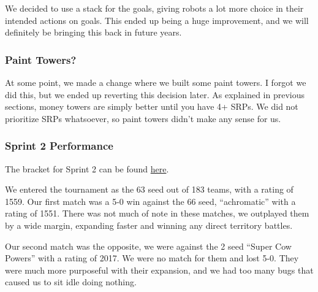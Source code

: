 \medskip

We decided to use a stack for the goals, giving robots a lot more choice in their intended actions on goals. This ended up being a huge improvement, and we will definitely be bringing this back in future years.

\subsubsection{Paint Towers?}

At some point, we made a change where we built some paint towers. I forgot we did this, but we ended up reverting this decision later. As explained in previous sections, money towers are simply better until you have 4+ SRPs. We did not prioritize SRPs whatsoever, so paint towers didn't make any sense for us.

\subsubsection{Sprint 2 Performance}

The bracket for Sprint 2 can be found \href{https://challonge.com/bc25javasprint2}{here}.

\medskip

We entered the tournament as the 63 seed out of 183 teams, with a rating of 1559. Our first match was a 5-0 win against the 66 seed, ``achromatic'' with a rating of 1551. There was not much of note in these matches, we outplayed them by a wide margin, expanding faster and winning any direct territory battles.

\medskip

Our second match was the opposite, we were against the 2 seed ``Super Cow Powers'' with a rating of 2017. We were no match for them and lost 5-0. They were much more purposeful with their expansion, and we had too many bugs that caused us to sit idle doing nothing.